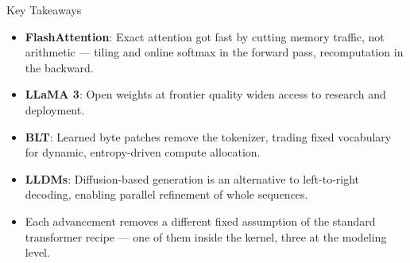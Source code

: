 \begin{frame}{Key Takeaways}
    \begin{itemize}
        \item \textbf{FlashAttention}: Exact attention got fast by cutting memory traffic, not arithmetic --- tiling and online softmax in the forward pass, recomputation in the backward.
        \item \textbf{LLaMA 3}: Open weights at frontier quality widen access to research and deployment.
        \item \textbf{BLT}: Learned byte patches remove the tokenizer, trading fixed vocabulary for dynamic, entropy-driven compute allocation.
        \item \textbf{LLDMs}: Diffusion-based generation is an alternative to left-to-right decoding, enabling parallel refinement of whole sequences.
        \item Each advancement removes a different fixed assumption of the standard transformer recipe --- one of them inside the kernel, three at the modeling level.
    \end{itemize}
\end{frame}
